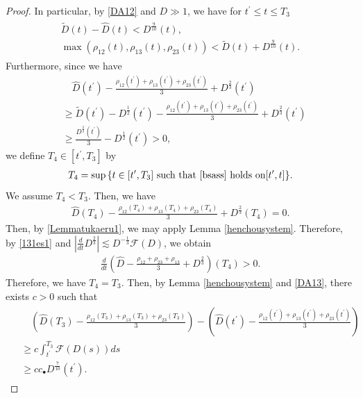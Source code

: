 \documentclass[reqno]{amsart}
\theoremstyle{plain}
\theoremstyle{definition}
\numberwithin{equation}{section}
\newcommand{\1}{\mathbbm{1}}
\begin{document}
\begin{proof}
In particular, by \eqref{DA12} and $D\gg 1$, we have for $t^{\prime}\leq t\leq T_3$
\begin{align}\label{Lemmatukaeru1}
\begin{aligned}
\tilde{D}(t)-\hat{D}(t)<D^{\frac{9}{10}}(t),
\\
\max{(\rho_{12}(t),\rho_{13}(t),\rho_{23}(t))}<\tilde{D}(t)+D^{\frac{9}{10}}(t).
\end{aligned}
\end{align}
Furthermore, since we have
\begin{align*}
&\quad \hat{D}(t^{\prime})-\frac{\rho_{12}(t^{\prime})+\rho_{13}(t^{\prime})+\rho_{23}(t^{\prime})}{3}+D^{\frac{2}{3}}(t^{\prime})
\\
&\geq \tilde{D}(t^{\prime})-D^{\frac{1}{2}}(t^{\prime})-\frac{\rho_{12}(t^{\prime})+\rho_{13}(t^{\prime})+\rho_{23}(t^{\prime})}{3}+D^{\frac{2}{3}}(t^{\prime})
\\
&\geq \frac{D^{\frac{2}{3}}(t^{\prime})}{3}-D^{\frac{1}{2}}(t^{\prime})> 0,
\end{align*}
we define $T_4\in [t^{\prime},T_3]$ by
\begin{align}\label{bs1.sono1}
T_4=\sup{\{t\in[t^{\prime},T_3]\ \mbox{such that \eqref{bsass} holds on} [t^{\prime},t]\}}.
\end{align}
We assume $T_4<T_3$. Then, we have 
\begin{align*}
\hat{D}(T_4)-\frac{\rho_{12}(T_4)+\rho_{13}(T_4)+\rho_{23}(T_4)}{3}+D^{\frac{2}{3}}(T_4)=0.
\end{align*}
Then, by \eqref{Lemmatukaeru1}, we may apply Lemma \ref{henchousystem}. Therefore, by \eqref{131es1} and $|\frac{d}{dt}D^{\frac{2}{3}}|\lesssim D^{-\frac{1}{3}}\mathcal{F}(D)$, we obtain
\begin{align*}
\frac{d}{dt}\left(\hat{D}-\frac{\rho_{12}+\rho_{23}+\rho_{13}}{3}+D^{\frac{2}{3}}\right)(T_4)>0.
\end{align*}
Therefore, we have $T_4=T_3$. Then, by Lemma \ref{henchousystem} and \eqref{DA13}, there exists $c>0$ such that 
\begin{align}\label{DA14}
\begin{aligned}
&\quad \left(\hat{D}(T_3)-\frac{\rho_{12}(T_3)+\rho_{13}(T_3)+\rho_{23}(T_3)}{3}\right)-\left(\hat{D}(t^{\prime})-\frac{\rho_{12}(t^{\prime})+\rho_{13}(t^{\prime})+\rho_{23}(t^{\prime})}{3}\right)
\\
&\geq c\int_{t^{\prime}}^{T_3}\mathcal{F}(D(s))ds
\\
&\geq cc_{\bullet}D^{\frac{7}{10}}(t^{\prime}).
\end{aligned}

\end{align}
\end{proof}
\end{document}

